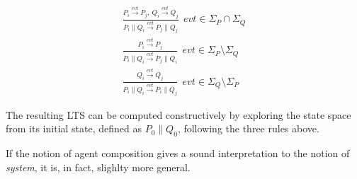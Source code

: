 \begin{eqnarray*}
\frac{P_i \stackrel{evt}{\longrightarrow} P_j,~Q_i \stackrel{evt}{\longrightarrow} Q_j}{P_i \parallel Q_i \stackrel{evt}{\longrightarrow} P_j \parallel Q_j}~~evt \in \Sigma_P \cap \Sigma_Q \\
\frac{P_i \stackrel{evt}{\longrightarrow} P_j}{P_i \parallel Q_i \stackrel{evt}{\longrightarrow} P_j \parallel Q_i}~~evt \in \Sigma_P \setminus \Sigma_Q \\
\frac{Q_i \stackrel{evt}{\longrightarrow} Q_j}{P_i \parallel Q_i \stackrel{evt}{\longrightarrow} P_i \parallel Q_j}~~evt \in \Sigma_Q \setminus \Sigma_P
\end{eqnarray*}

The resulting LTS can be computed constructively by exploring the state space from its initial state, defined as $P_0 \parallel Q_0$, following the three rules above.

If the notion of agent composition gives a sound interpretation to the notion of \emph{system}, it is, in fact, slighlty more general. 




